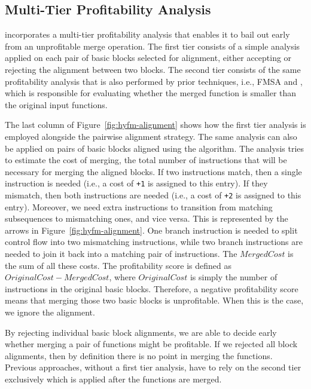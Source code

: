 \subsection{Multi-Tier Profitability Analysis}
\label{sec:multi-profitability}

{\ProjName} incorporates a multi-tier profitability analysis that enables it to bail out early from an unprofitable merge operation.
The first tier consists of a simple analysis applied on each pair of basic blocks selected for alignment, either accepting or rejecting the alignment between two blocks. 
The second tier consists of the same profitability analysis that is also performed by prior techniques, i.e., FMSA and {\SOAName}, which is responsible for evaluating whether the merged function is smaller than the original input functions.

The last column of Figure~\ref{fig:hyfm-alignment} shows how the first tier analysis is employed alongside the pairwise alignment strategy.
The same analysis can also be applied on pairs of basic blocks aligned using the \NW algorithm.
The analysis tries to estimate the cost of merging, the total number of instructions that will be necessary for merging the aligned blocks.
If two instructions match, then a single instruction is needed (i.e., a cost of \texttt{+1} is assigned to this entry).
If they mismatch, then both instructions are needed (i.e., a cost of \texttt{+2} is assigned to this entry).
Moreover, we need extra instructions to transition from matching subsequences to mismatching ones, and vice versa.
This is represented by the arrows in Figure~\ref{fig:hyfm-alignment}.
One branch instruction is needed to split control flow into two mismatching instructions, while two branch instructions are needed to join it back into a matching pair of instructions. 
The $MergedCost$ is the sum of all these costs.
The profitability score is defined as $OriginalCost - MergedCost$, where $OriginalCost$ is simply the number of instructions in the original basic blocks.
Therefore, a negative profitability score means that merging those two basic blocks is unprofitable. When this is the case, we ignore the alignment.

By rejecting individual basic block alignments, we are able to decide early whether merging a pair of functions might be profitable. If we rejected all block alignments, then by definition there is no point in merging the functions. Previous approaches, without a first tier analysis, have to rely on the second tier exclusively which is applied after the functions are merged.

